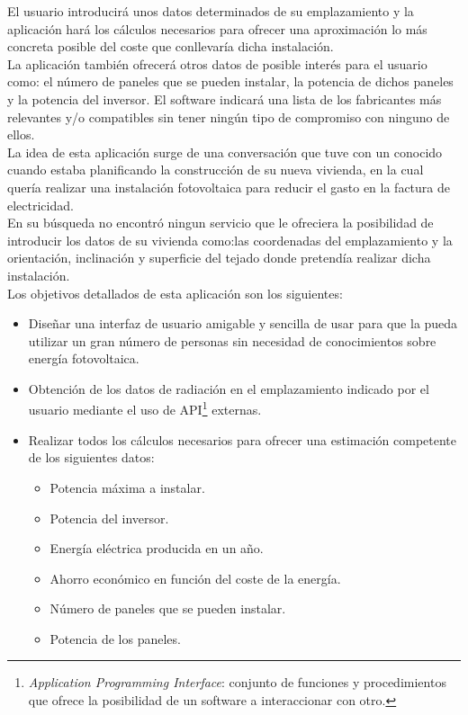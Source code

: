 \documentclass[11pt]{article}
\begin{document}
El usuario introducirá unos datos determinados de su emplazamiento y la aplicación hará los cálculos necesarios para ofrecer una aproximación lo más concreta posible del coste que conllevaría dicha instalación.\\

La aplicación también ofrecerá otros datos de posible interés para el usuario como: el número de paneles que se pueden instalar, la potencia de dichos paneles y la potencia del inversor. El software indicará una lista de los fabricantes más relevantes y/o compatibles sin tener ningún tipo de compromiso con ninguno de ellos.\\

La idea de esta aplicación surge de una conversación que tuve con un conocido cuando estaba planificando la construcción de su nueva vivienda, en la cual quería realizar una instalación fotovoltaica para reducir el gasto en la factura de electricidad.\\

En su búsqueda no encontró ningun servicio que le ofreciera la posibilidad de introducir los datos de su vivienda como:las coordenadas del emplazamiento y la orientación, inclinación y superficie del tejado donde pretendía realizar dicha instalación.\\


Los objetivos detallados de esta aplicación son los siguientes:
\begin{itemize}
\item Diseñar una interfaz de usuario amigable y sencilla de usar para que la pueda utilizar un gran número de personas sin necesidad de conocimientos sobre energía fotovoltaica.

\item Obtención de los datos de radiación en el emplazamiento indicado por el usuario mediante el uso de API\footnote{\textit{Application Programming Interface}: conjunto de funciones y procedimientos que ofrece la posibilidad de un software a interaccionar con otro.} externas.
\item Realizar todos los cálculos necesarios para ofrecer una estimación competente de los siguientes datos:
\begin{itemize}

\item Potencia máxima a instalar.
\item Potencia del inversor.
\item Energía eléctrica producida en un año.
\item Ahorro económico en función del coste de la energía.
\item Número de paneles que se pueden instalar.
\item Potencia de los paneles.

\end{itemize}
\end{itemize}
\newpage
\end{document}
